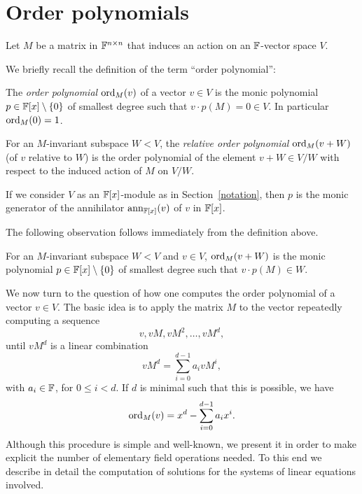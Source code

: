 \section{Order polynomials}
\label{ordpoly}

Let $M$ be a matrix in $\mathbb{F}^{n \times n}$ that induces an action
on an $\mathbb{F}$-vector space $V$.

We briefly recall the definition of the term ``order polynomial'':

\begin{Def}
{\rm
The \emph{order polynomial} $\mathrm{ord}_M(v)$ of a vector $v \in V$ is the
%
%
monic polynomial $p \in \mathbb{F}[x] \setminus \{0\}$ of smallest degree such that $v \cdot
p(M) = 0 \in V$. In particular $\mathrm{ord}_M(0)=1$.

For an $M$-invariant subspace  $W < V$, the \emph{relative order polynomial}
$\mathrm{ord}_M(v+W)$ (of $v$ relative to $W$) is the order polynomial of the element
$v+W \in V/W$ with respect to the induced action of $M$ on $V/W$.
}
\end{Def}

\begin{Rem}
If we consider $V$ as an $\mathbb{F}[x]$-module as in 
Section~\ref{notation}, then $p$ is the monic generator
of the annihilator $\mathrm{ann}_{\mathbb{F}[x]}(v)$ of $v$ in $\mathbb{F}[x]$.
\end{Rem}

The following observation follows immediately from the definition above.

\begin{Lemm}
\label{relorderpol}
%
For an $M$-invariant subspace  $W < V$ and $v\in V$, 
$\mathrm{ord}_M(v+W)$ is the monic polynomial $p \in \mathbb{F}[x] \setminus \{0\}$ 
of smallest degree such 
that $v \cdot p(M) \in W$.
\end{Lemm}

We now turn to the question of how one computes the order polynomial of
a vector $v \in V$. The basic idea is to apply the matrix
$M$ to the vector repeatedly computing a sequence \[ v, vM, vM^2, \ldots,
vM^d, \]
until $vM^d$ is a linear combination
\[ 
vM^d = \sum_{i=0}^{d-1} a_i vM^i, 
\]
with $a_i \in \mathbb{F}$, for $0 \le i < d$. If $d$ is minimal such that
this is possible, we have
\[ \mathrm{ord}_M(v) = x^d - \sum_{i=0}^{d-1} a_i x^i. 
\]
Although this procedure is simple and well-known, we 
present it in order to make explicit the number of elementary field 
operations needed.
To this end we describe in detail the computation of solutions for
the systems of linear equations involved. 

